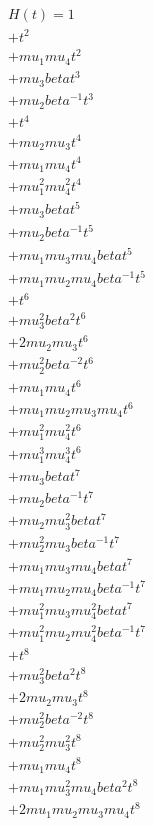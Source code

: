 \begin{align*}
H(t) = {}1 \\
  + t^{2} \\
  + mu_1 mu_4 t^{2} \\
  + mu_3 beta t^{3} \\
  + mu_2 beta^{-1} t^{3} \\
  + t^{4} \\
  + mu_2 mu_3 t^{4} \\
  + mu_1 mu_4 t^{4} \\
  + mu_1^{2} mu_4^{2} t^{4} \\
  + mu_3 beta t^{5} \\
  + mu_2 beta^{-1} t^{5} \\
  + mu_1 mu_3 mu_4 beta t^{5} \\
  + mu_1 mu_2 mu_4 beta^{-1} t^{5} \\
  + t^{6} \\
  + mu_3^{2} beta^{2} t^{6} \\
  + 2 mu_2 mu_3 t^{6} \\
  + mu_2^{2} beta^{-2} t^{6} \\
  + mu_1 mu_4 t^{6} \\
  + mu_1 mu_2 mu_3 mu_4 t^{6} \\
  + mu_1^{2} mu_4^{2} t^{6} \\
  + mu_1^{3} mu_4^{3} t^{6} \\
  + mu_3 beta t^{7} \\
  + mu_2 beta^{-1} t^{7} \\
  + mu_2 mu_3^{2} beta t^{7} \\
  + mu_2^{2} mu_3 beta^{-1} t^{7} \\
  + mu_1 mu_3 mu_4 beta t^{7} \\
  + mu_1 mu_2 mu_4 beta^{-1} t^{7} \\
  + mu_1^{2} mu_3 mu_4^{2} beta t^{7} \\
  + mu_1^{2} mu_2 mu_4^{2} beta^{-1} t^{7} \\
  + t^{8} \\
  + mu_3^{2} beta^{2} t^{8} \\
  + 2 mu_2 mu_3 t^{8} \\
  + mu_2^{2} beta^{-2} t^{8} \\
  + mu_2^{2} mu_3^{2} t^{8} \\
  + mu_1 mu_4 t^{8} \\
  + mu_1 mu_3^{2} mu_4 beta^{2} t^{8} \\
  + 2 mu_1 mu_2 mu_3 mu_4 t^{8} \\

\end{align*}
